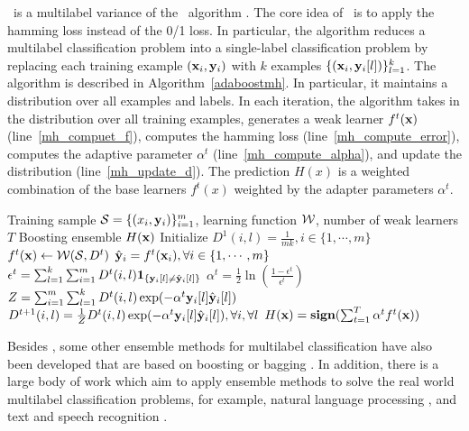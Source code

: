 {\adaboostmh\ is a multilabel variance of the \adaboost\ algorithm \citep{Schapire99improved,Esuli2008boosting}.
The core idea of \adaboostmh\ is to apply the hamming loss instead of the 0/1 loss. 
In particular, the algorithm reduces a multilabel classification problem into a single-label classification problem by replacing each training example $(\mathbf {x}_i,\mathbf {y}_i)$ with $k$ examples $\{(\mathbf {x}_i,\mathbf {y}_i[l])\}_{l=1}^k$.
The algorithm is described in Algorithm~\ref{adaboostmh}.
In particular, it maintains a distribution over all examples and labels.
In each iteration, the algorithm takes in the distribution over all training examples, generates a weak learner $f^t(\mathbf {x})$ (line~\ref{mh_compuet_f}), computes the hamming loss (line~\ref{mh_compute_error}), computes the adaptive parameter $\alpha^t$ (line~\ref{mh_compute_alpha}), and update the distribution (line~\ref{mh_update_d}).
The prediction $H(x)$ is a weighted combination of the base learners $f^t(x)$ weighted by the adapter parameters $\alpha^t$.
\begin{algorithm}
\caption{\adaboostmh}
\label{adaboostmh}
\begin{algorithmic}[1]
	\REQUIRE Training sample $\mathcal{S} = \{(x_i,\mathbf {y}_i)\}_{i=1}^m$, learning function $\mathcal{W}$, number of weak learners $T$
	\ENSURE Boosting ensemble $H(\mathbf {x})$
	\STATE Initialize $D^1(i,l)=\frac{1}{mk},i\in\{1,\cdots,m\}$
		\STATE $f^t(\mathbf {x})\leftarrow\mathcal{W}(\mathcal{S},D^{t})$ \label{mh_compuet_f}
		\STATE $\hat{\mathbf {y}}_i = f^t(\mathbf {x}_i),\forall i\in\{1,\cdots,m\}$
		\STATE $\epsilon^t =\sum_{l=1}^k\sum_{i=1}^{m}D^t(i,l)\mathbf{1}_{\{\mathbf {y}_i[l]\neq\hat{\mathbf {y}}_i[l]\}}$ \label{mh_compute_error}
		\STATE $\alpha^{t} = \frac{1}{2}\ln\left(\frac{1-\epsilon^t}{\epsilon^t}\right)$ \label{mh_compute_alpha}
		\STATE $Z=\sum_{i=1}^{m}\sum_{l=1}^{k}D^{t}(i,l)\exp(-\alpha^t\mathbf {y}_i[l]\hat{\mathbf {y}}_i[l])$
		\STATE $D^{t+1}(i,l) = \frac{1}{Z}D^{t}(i,l)\exp(-\alpha^t\mathbf {y}_i[l]\hat{\mathbf {y}}_i[l]),\forall i,\forall l$ \label{mh_update_d}
	\ENDFOR
	\RETURN $H(\mathbf {x}) = \textbf{sign}(\sum_{t=1}^T\alpha^tf^t(\mathbf {x}))$
\end{algorithmic}
\end{algorithm}

Besides \adaboostmh, some other ensemble methods for multilabel classification have also been developed that are based on boosting or bagging \citep{Wang07simple,Yan07model,Kocev13tree}.
In addition, there is a large body of work which aim to apply ensemble methods to solve the real world multilabel classification problems, for example, natural language processing \citep{Collins05distrimnative,Zeman05improving,Sagae06parsing,Zhang09kbest}, and text and speech recognition \citep{Fiscus97a,Benesty08speech,Petrov10products}.


}
